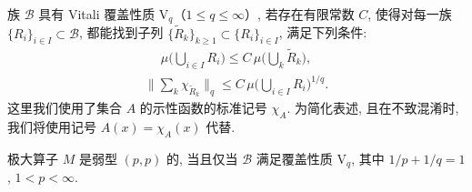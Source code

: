 \begin{definition}\label{def:2.4}
族 $\mathcal{B}$ 具有 Vitali 覆盖性质 $\mathrm{V}_q$（$1 \leq q \leq \infty$）, 若存在有限常数 $C$, 使得对每一族 $\{R_i\}_{i \in I} \subset \mathcal{B}$, 都能找到子列 $\{\tilde{R}_k\}_{k \geq 1} \subset \{R_i\}_{i \in I}$, 满足下列条件:
\begin{align*}
  \mu\Big(\bigcup_{i\in I}R_{i}\Big)\leq C\,\mu\Big(\bigcup_{k}\tilde{R}_{k}\Big),
\end{align*}
\begin{align*}
  \Big\|\sum_{k}\chi_{\tilde{R}_{k}}\Big\|_{q}\leq C\,\mu\Big(\bigcup_{i\in I}R_{i}\Big)^{1/q}.
\end{align*}
这里我们使用了集合 $A$ 的示性函数的标准记号 $\chi_{A}$. 为简化表述, 且在不致混淆时, 我们将使用记号 $A(x) = \chi_{A}(x)$ 代替.
\end{definition}

\begin{theorem}\label{thm:2.5}
极大算子 $M$ 是弱型 $(p,p)$ 的, 当且仅当 $\mathcal{B}$ 满足覆盖性质 $\mathrm{V}_{q}$, 其中 $1/p+1/q=1$, $1<p<\infty$.
\end{theorem}

